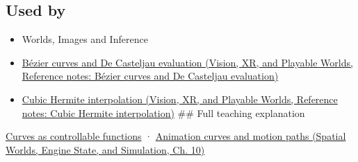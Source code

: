 \subsection{Used by}\label{appendix-f28eeec97a3d-used-by}

\hypertarget{appendix-f28eeec97a3d-used-by}{}

\begin{itemize}
\item
  {Worlds, Images and Inference}
\item
  \href{../07-Vision-XR-and-Playable-Worlds/main.pdf\#nameddest=appendix-ddbec701898c}{Bézier curves and De Casteljau evaluation (Vision, XR, and Playable Worlds, Reference notes: Bézier curves and De Casteljau evaluation)}
\item
  \href{../07-Vision-XR-and-Playable-Worlds/main.pdf\#nameddest=appendix-db3aef8f2fd6}{Cubic Hermite interpolation (Vision, XR, and Playable Worlds, Reference notes: Cubic Hermite interpolation)} \#\# Full teaching explanation
\end{itemize}

\hyperref[03-visual-computing-i-ch001-curves-as-controllable-functions]{Curves as controllable functions} · \href{../05-Spatial-Worlds-Engine-State-and-Simulation/main.pdf\#nameddest=04-visual-computing-ii-ch029-animation-curves-and-motion-paths}{Animation curves and motion paths (Spatial Worlds, Engine State, and Simulation, Ch. 10)}
